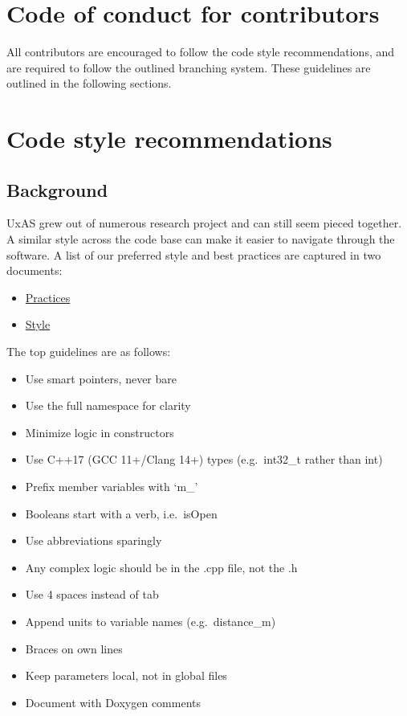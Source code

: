 \section{Code of conduct for
contributors}\label{code-of-conduct-for-contributors}

All contributors are encouraged to follow the code style
recommendations, and are required to follow the outlined branching
system. These guidelines are outlined in the following sections.

\section{Code style recommendations}\label{code-style-recommendations}

\subsection{Background}\label{background}

UxAS grew out of numerous research project and can still seem pieced
together. A similar style across the code base can make it easier to
navigate through the software. A list of our preferred style and best
practices are captured in two documents:

\begin{itemize}
\item
  \href{run:../../doxygen/files/CppProgrammingPracticesGuide.html}{Practices}
\item
  \href{run:../../doxygen/files/CppProgrammingStyleGuide.html}{Style}
\end{itemize}

The top guidelines are as follows:

\begin{itemize}
\item
  Use smart pointers, never bare
\item
  Use the full namespace for clarity
\item
  Minimize logic in constructors
\item
  Use C++17 (GCC 11+/Clang 14+) types (e.g.~int32\_t rather than int)
\item
  Prefix member variables with `m\_'
\item
  Booleans start with a verb, i.e.~isOpen
\item
  Use abbreviations sparingly
\item
  Any complex logic should be in the .cpp file, not the .h
\item
  Use 4 spaces instead of tab
\item
  Append units to variable names (e.g.~distance\_m)
\item
  Braces on own lines
\item
  Keep parameters local, not in global files
\item
  Document with Doxygen comments
\end{itemize}

